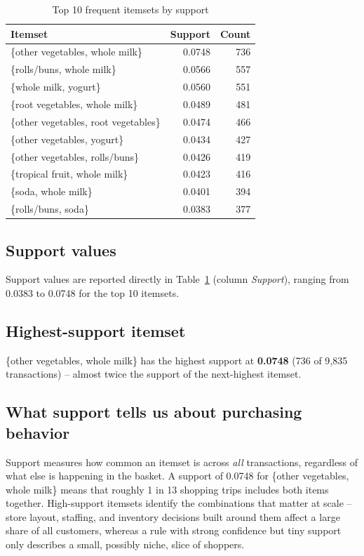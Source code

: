\documentclass[12pt,a4paper]{article}
\begin{document}
\begin{table}[H]
\centering
\caption{Top 10 frequent itemsets by support}
\label{tab:itemsets}
\begin{tabular}{lrr}
\toprule
\textbf{Itemset} & \textbf{Support} & \textbf{Count} \\
\midrule
\{other vegetables, whole milk\}        & 0.0748 & 736 \\
\{rolls/buns, whole milk\}              & 0.0566 & 557 \\
\{whole milk, yogurt\}                  & 0.0560 & 551 \\
\{root vegetables, whole milk\}         & 0.0489 & 481 \\
\{other vegetables, root vegetables\}   & 0.0474 & 466 \\
\{other vegetables, yogurt\}            & 0.0434 & 427 \\
\{other vegetables, rolls/buns\}        & 0.0426 & 419 \\
\{tropical fruit, whole milk\}          & 0.0423 & 416 \\
\{soda, whole milk\}                    & 0.0401 & 394 \\
\{rolls/buns, soda\}                    & 0.0383 & 377 \\
\bottomrule
\end{tabular}
\end{table}

\subsection{Support values}
Support values are reported directly in Table~\ref{tab:itemsets} (column \emph{Support}),
ranging from 0.0383 to 0.0748 for the top 10 itemsets.

\subsection{Highest-support itemset}
\{other vegetables, whole milk\} has the highest support at \textbf{0.0748} (736 of 9{,}835
transactions) -- almost twice the support of the next-highest itemset.

\subsection{What support tells us about purchasing behavior}
Support measures how common an itemset is across \emph{all} transactions, regardless of
what else is happening in the basket. A support of 0.0748 for \{other vegetables, whole
milk\} means that roughly 1 in 13 shopping trips includes both items together. High-support
itemsets identify the combinations that matter at scale -- store layout, staffing, and
inventory decisions built around them affect a large share of all customers, whereas a
rule with strong confidence but tiny support only describes a small, possibly niche, slice
of shoppers.
\end{document}
